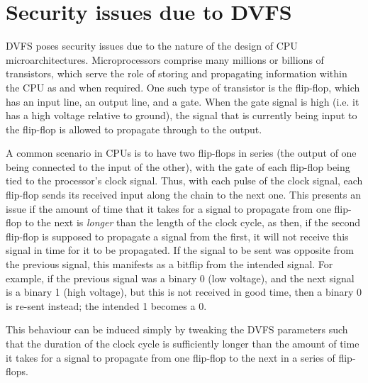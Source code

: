 \section{Security issues due to DVFS}

DVFS poses security issues due to the nature of the design of CPU
microarchitectures. Microprocessors comprise many millions or billions of
transistors, which serve the role of storing and propagating information within
the CPU as and when required. One such type of transistor is the flip-flop,
which has an input line, an output line, and a gate. When the gate signal is
high (i.e. it has a high voltage relative to ground), the signal that is
currently being input to the flip-flop is allowed to propagate through to the
output.

A common scenario in CPUs is to have two flip-flops in series (the
output of one being connected to the input of the other), with the gate of each
flip-flop being tied to the processor's clock signal. Thus, with each pulse of
the clock signal, each flip-flop sends its received input along the chain to the
next one. This presents an issue if the amount of time that it takes for a
signal to propagate from one flip-flop to the next is \emph{longer} than the
length of the clock cycle, as then, if the second flip-flop is supposed to
propagate a signal from the first, it will not receive this signal in time for
it to be propagated. If the signal to be sent was opposite from the previous
signal, this manifests as a bitflip from the intended signal. For example, if
the previous signal was a binary 0 (low voltage), and the next signal is a
binary 1 (high voltage), but this is not received in good time, then a binary 0
is re-sent instead; the intended 1 becomes a 0.

This behaviour can be induced simply by tweaking the DVFS parameters such that
the duration of the clock cycle is sufficiently longer than the amount of time
it takes for a signal to propagate from one flip-flop to the next in a series
of flip-flops.
